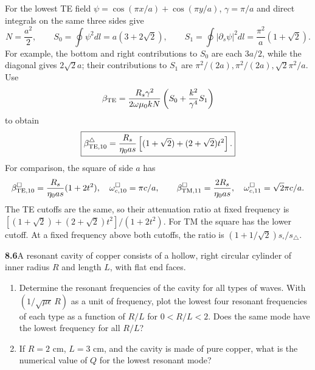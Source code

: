 For the lowest TE field $\psi=\cos(\pi x/a)+\cos(\pi y/a)$,
$\gamma=\pi/a$ and direct integrals on the same three sides give
\[
N=\frac{a^2}2,\qquad S_0=\oint\psi^2dl=a(3+2\sqrt2),\qquad
S_1=\oint|\partial_s\psi|^2dl=\frac{\pi^2}{a}(1+\sqrt2).
\]
For example, the bottom and right contributions to $S_0$ are each
$3a/2$, while the diagonal gives $2\sqrt2a$; their contributions
to $S_1$ are $\pi^2/(2a),\pi^2/(2a),\sqrt2\pi^2/a$.
Use
\[
\beta_{\rm TE}=\frac{R_s\gamma^2}{2\omega\mu_0kN}
\left(S_0+\frac{k^2}{\gamma^4}S_1\right)
\]
to obtain
\[
\boxed{\beta_{{\rm TE},10}^{\triangle}
=\frac{R_s}{\eta_0a s}
\left[(1+\sqrt2)+(2+\sqrt2)t^2\right].}
\]
For comparison, the square of side $a$ has
\[
\beta_{{\rm TE},10}^{\square}=\frac{R_s}{\eta_0a s}(1+2t^2),
\quad\omega_{c,10}^{\square}=\pi c/a,
\qquad
\beta_{{\rm TM},11}^{\square}=\frac{2R_s}{\eta_0a s},
\quad\omega_{c,11}^{\square}=\sqrt2\pi c/a.
\]
The TE cutoffs are the same, so their attenuation ratio at fixed
frequency is $[(1+\sqrt2)+(2+\sqrt2)t^2]/(1+2t^2)$.
For TM the square has the lower cutoff.  At a fixed frequency above
both cutoffs, the ratio is
$(1+1/\sqrt2)s_{\square}/s_{\triangle}$.

\par\bigskip
\noindent\textbf{8.6}\quad A resonant cavity of copper consists of a hollow, right circular cylinder of inner radius $R$ and length $L$, with flat end faces.
\begin{enumerate}
\item[(a)] Determine the resonant frequencies of the cavity for all types of waves. With $(1/\sqrt{\mu\epsilon}\,R)$ as a unit of frequency, plot the lowest four resonant frequencies of each type as a function of $R/L$ for $0<R/L<2$. Does the same mode have the lowest frequency for all $R/L$?
\item[(b)] If $R=2$ cm, $L=3$ cm, and the cavity is made of pure copper, what is the numerical value of $Q$ for the lowest resonant mode?
\end{enumerate}
\solution

